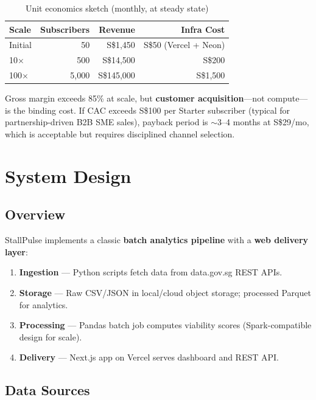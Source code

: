 \documentclass[11pt,a4paper]{article}
\begin{document}
\begin{table}[H]
\centering
\caption{Unit economics sketch (monthly, at steady state)}
\label{tab:unit}
\begin{tabular}{@{}lrrr@{}}
\toprule
\textbf{Scale} & \textbf{Subscribers} & \textbf{Revenue} & \textbf{Infra Cost} \\
\midrule
Initial & 50 & S\$1,450 & S\$50 (Vercel + Neon) \\
10$\times$ & 500 & S\$14,500 & S\$200 \\
100$\times$ & 5,000 & S\$145,000 & S\$1,500 \\
\bottomrule
\end{tabular}
\end{table}

Gross margin exceeds 85\% at scale, but \textbf{customer acquisition}---not compute---is the binding cost. If CAC exceeds S\$100 per Starter subscriber (typical for partnership-driven B2B SME sales), payback period is $\sim$3--4 months at S\$29/mo, which is acceptable but requires disciplined channel selection.

\section{System Design}

\subsection{Overview}

StallPulse implements a classic \textbf{batch analytics pipeline} with a \textbf{web delivery layer}:

\begin{enumerate}
  \item \textbf{Ingestion} --- Python scripts fetch data from data.gov.sg REST APIs.
  \item \textbf{Storage} --- Raw CSV/JSON in local/cloud object storage; processed Parquet for analytics.
  \item \textbf{Processing} --- Pandas batch job computes viability scores (Spark-compatible design for scale).
  \item \textbf{Delivery} --- Next.js app on Vercel serves dashboard and REST API.
\end{enumerate}

\subsection{Data Sources}
\end{document}
